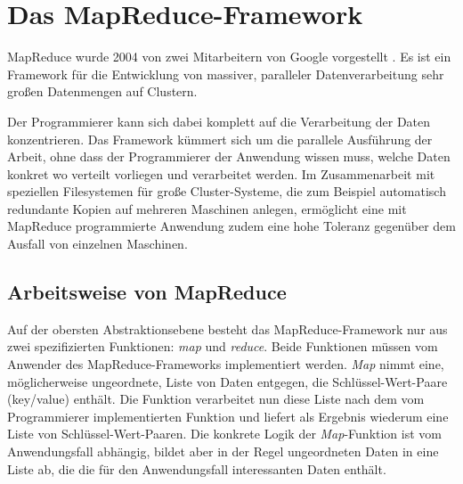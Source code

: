 \section{Das MapReduce-Framework}
MapReduce wurde 2004 von zwei Mitarbeitern von Google vorgestellt \cite{dean2008mapreduce}. Es ist ein Framework
für die Entwicklung von massiver, paralleler Datenverarbeitung sehr großen Datenmengen auf Clustern.

Der Programmierer
kann sich dabei komplett auf die Verarbeitung der Daten konzentrieren. Das Framework kümmert sich um die parallele
Ausführung der Arbeit, ohne dass der Programmierer der Anwendung wissen muss, welche Daten konkret wo verteilt vorliegen
und verarbeitet werden. 
Im Zusammenarbeit mit speziellen Filesystemen 
für große Cluster-Systeme, die zum Beispiel automatisch redundante Kopien auf mehreren Maschinen anlegen, ermöglicht
eine mit MapReduce programmierte Anwendung zudem eine hohe Toleranz gegenüber dem Ausfall von einzelnen Maschinen.

\subsection{Arbeitsweise von MapReduce}
Auf der obersten Abstraktionsebene besteht das MapReduce-Framework nur aus zwei spezifizierten Funktionen: \textit{map} und \textit{reduce}.
Beide Funktionen müssen vom Anwender des MapReduce-Frameworks implementiert werden.
\textit{Map} nimmt eine, möglicherweise ungeordnete, Liste von Daten entgegen, die Schlüssel-Wert-Paare (key/value) enthält. Die Funktion 
verarbeitet nun diese Liste nach dem vom Programmierer implementierten Funktion und liefert als Ergebnis wiederum eine
Liste von Schlüssel-Wert-Paaren. Die konkrete Logik der \textit{Map}-Funktion ist vom Anwendungsfall abhängig, bildet aber in der Regel
ungeordneten Daten in eine Liste ab, die die für den Anwendungsfall interessanten Daten enthält. 



